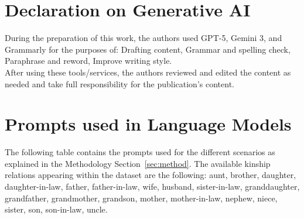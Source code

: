 \documentclass[
]{ceurart}
\begin{document}
\section*{Declaration on Generative AI}
During the preparation of this work, the authors used GPT-5, Gemini 3, and Grammarly for the purposes of: Drafting content, Grammar and spelling check, Paraphrase and reword, Improve writing style.\\ 
After using these tools/services, the authors reviewed and edited the content as needed and take full responsibility for the publication’s content. 



\clearpage
\appendix

\section{Prompts used in Language Models}\label{sec:prompts}

The following table contains the prompts used for the different scenarios as explained in the Methodology Section~\ref{sec:method}. The available kinship relations appearing within the dataset are the following: aunt, brother, daughter, daughter-in-law, father, father-in-law, wife, husband, sister-in-law, granddaughter, grandfather, grandmother, grandson, mother, mother-in-law, nephew, niece, sister, son, son-in-law, uncle.
\end{document}
